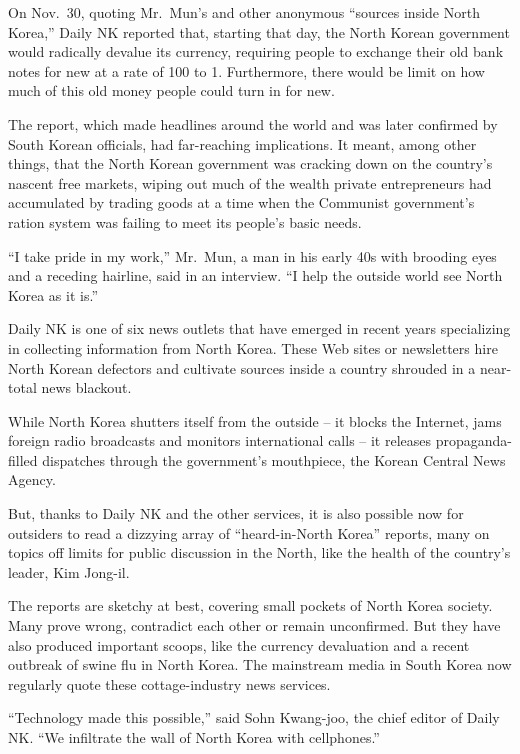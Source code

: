 ﻿\documentclass[12pt]{article}
\begin{document}
On Nov.~30, quoting Mr.~Mun's and other anonymous ``sources inside North Korea,'' Daily NK reported
that, starting that day, the North Korean government would radically devalue its currency, requiring
people to exchange their old bank notes for new at a rate of 100 to 1. Furthermore, there would be
limit on how much of this old money people could turn in for new.

The report, which made headlines around the world and was later confirmed by South Korean officials,
had far-reaching implications. It meant, among other things, that the North Korean government was
cracking down on the country's nascent free markets, wiping out much of the wealth private
entrepreneurs had accumulated by trading goods at a time when the Communist government's ration
system was failing to meet its people's basic needs.

``I take pride in my work,'' Mr.~Mun, a man in his early 40s with brooding eyes and a receding
hairline, said in an interview. ``I help the outside world see North Korea as it is.''

Daily NK is one of six news outlets that have emerged in recent years specializing in collecting
information from North Korea. These Web sites or newsletters hire North Korean defectors and
cultivate sources inside a country shrouded in a near-total news blackout.

While North Korea shutters itself from the outside -- it blocks the Internet, jams foreign radio
broadcasts and monitors international calls -- it releases propaganda-filled dispatches through the
government's mouthpiece, the Korean Central News Agency.

But, thanks to Daily NK and the other services, it is also possible now for outsiders to read a
dizzying array of ``heard-in-North Korea'' reports, many on topics off limits for public discussion
in the North, like the health of the country's leader, Kim Jong-il.

The reports are sketchy at best, covering small pockets of North Korea society. Many prove wrong,
contradict each other or remain unconfirmed. But they have also produced important scoops, like the
currency devaluation and a recent outbreak of swine flu in North Korea. The mainstream media in
South Korea now regularly quote these cottage-industry news services.

``Technology made this possible,'' said Sohn Kwang-joo, the chief editor of Daily NK. ``We
infiltrate the wall of North Korea with cellphones.''
\end{document}
